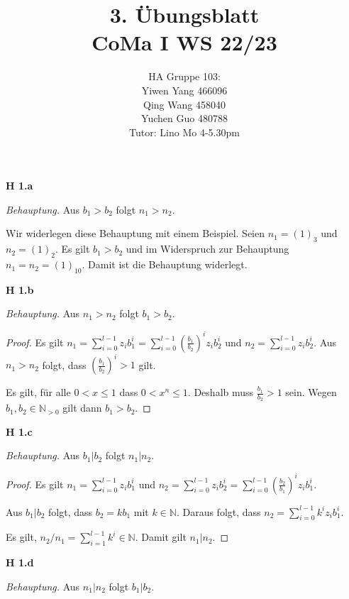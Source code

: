 \documentclass[12pt]{extarticle}
\author{HA Gruppe 103: \\Yiwen Yang 466096\\Qing Wang 458040\\Yuchen Guo 480788\\Tutor: Lino Mo 4-5.30pm}
\title{3. Übungsblatt\\\small CoMa I WS 22/23}
\date{}
\begin{document}
\maketitle
\newpage

\textbf{H 1.a}

\textit{Behauptung.}  Aus \(b_1 > b_2\) folgt \(n_1 > n_2\).

\vspace{4mm}

Wir widerlegen diese Behauptung mit einem Beispiel.  Seien \(n_1=(1)_3\)
und \(n_2=(1)_2\).  Es gilt \(b_1 > b_2\) und im Widerspruch zur
Behauptung \(n_1=n_2=(1)_{10}\).  Damit ist die Behauptung widerlegt.

\vspace{4mm}

\textbf{H 1.b}

\textit{Behauptung.}  Aus \(n_1 > n_2\) folgt \(b_1 > b_2\).

\begin{proof}
  Es gilt
  $n_1=\sum_{i=0}^{l-1}{z_ib_1^i}=\sum_{i=0}^{l-1}{ \left(
      \frac{b_1}{b_2} \right)^iz_i b_2^i}$ und
  \(n_2=\sum_{i=0}^{l-1}{z_ib_2^i}\).  Aus \(n_1>n_2\) folgt, dass
  \(\left( \frac{b_1}{b_2} \right)^i > 1\) gilt.

  Es gilt, für alle \(0 < x \leq 1\) dass \(0 < x^n \leq 1\).  Deshalb
  muss \(\frac{b_1}{b_2}>1\) sein.  Wegen \(b_1, b_2 \in \mathbb{N}_{>0}\)
  gilt dann \(b_1>b_2\).

\end{proof}

\textbf{H 1.c}

\textit{Behauptung.}  Aus \(b_1|b_2\) folgt \(n_1|n_2\).

\begin{proof}
  Es gilt \(n_1=\sum_{i=0}^{l-1}{z_ib_1^i}\) und
  $n_2=\sum_{i=0}^{l-1}{z_ib_2^i}=\sum_{i=0}^{l-1}{
    \left( \frac{b_2}{b_1}  \right)^iz_i b_1^i}$.


  Aus \(b_1|b_2\) folgt, dass \(b_2 = kb_1\) mit \(k \in \mathbb{N}\).
  Daraus folgt, dass \(n_2=\sum_{i=0}^{l-1}{ k^i z_i b_1^i}\).

  Es gilt, \(n_2/n_1=\sum_{i=1}^{l-1}{k^i} \in \mathbb{N}\).  Damit gilt
  \(n_1|n_2\).
\end{proof}

\textbf{H 1.d}

\textit{Behauptung.}  Aus \(n_1|n_2\) folgt \(b_1|b_2\).

\vspace{4mm}
\end{document}
